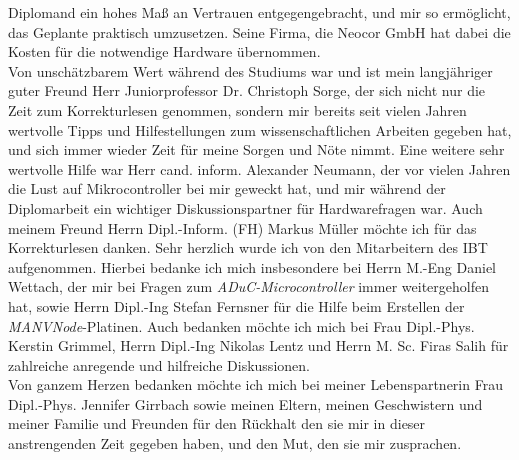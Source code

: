 Diplomand ein hohes Maß an Vertrauen entgegengebracht, und mir so ermöglicht, das Geplante praktisch umzusetzen. Seine Firma,
die Neocor GmbH hat dabei die Kosten für die notwendige Hardware übernommen.\\
Von unschätzbarem Wert während des Studiums war und ist mein langjähriger guter Freund Herr Juniorprofessor Dr. Christoph
Sorge, der sich nicht nur die Zeit zum Korrekturlesen genommen, sondern mir bereits seit vielen Jahren wertvolle
Tipps und Hilfestellungen zum wissenschaftlichen Arbeiten gegeben hat, und sich immer wieder Zeit für meine Sorgen 
und Nöte nimmt.  Eine weitere sehr wertvolle Hilfe war Herr cand. inform. Alexander Neumann, der vor vielen Jahren 
die Lust auf 
Mikrocontroller bei mir geweckt hat, und mir während der Diplomarbeit ein wichtiger Diskussionspartner für 
Hardwarefragen war. Auch meinem Freund Herrn Dipl.-Inform. (FH) Markus Müller möchte ich für das Korrekturlesen danken.
Sehr herzlich wurde ich von den Mitarbeitern des IBT aufgenommen. Hierbei bedanke ich mich insbesondere bei Herrn
M.-Eng Daniel Wettach, der mir bei Fragen zum \emph{ADuC-Microcontroller} immer weitergeholfen hat, sowie Herrn
Dipl.-Ing Stefan Fernsner für die Hilfe beim Erstellen der \emph{MANVNode}-Platinen. Auch bedanken möchte ich mich bei 
Frau Dipl.-Phys. Kerstin Grimmel, Herrn Dipl.-Ing Nikolas 
Lentz und Herrn M. Sc. Firas Salih für zahlreiche anregende und hilfreiche Diskussionen.\\
Von ganzem Herzen bedanken möchte ich mich bei meiner Lebenspartnerin Frau Dipl.-Phys. Jennifer Girrbach sowie meinen Eltern,
meinen Geschwistern und meiner Familie und Freunden für den Rückhalt den sie mir in dieser anstrengenden Zeit gegeben
haben, und den Mut, den sie mir zusprachen.
